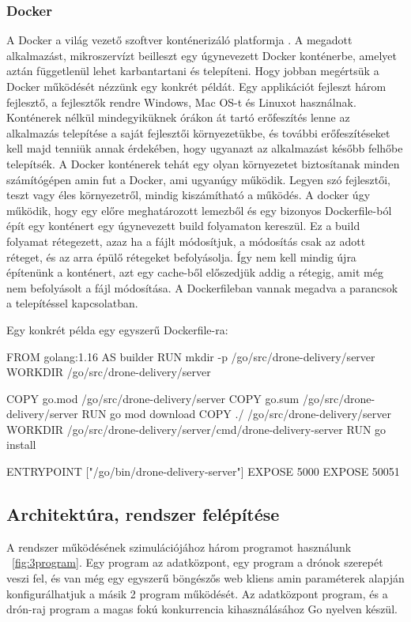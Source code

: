 \subsubsection{Docker}
A Docker a világ vezető szoftver konténerizáló platformja \cite{docker}.
A megadott alkalmazást, mikroszervízt beilleszt egy úgynevezett Docker konténerbe, amelyet aztán függetlenül lehet karbantartani és telepíteni.
Hogy jobban megértsük a Docker működését nézzünk egy konkrét példát.
Egy applikációt fejleszt három fejlesztő, a fejlesztők rendre Windows, Mac OS-t és Linuxot használnak.
Konténerek nélkül mindegyiküknek órákon át tartó erőfeszítés lenne az alkalmazás telepítése a saját fejlesztői környezetükbe, és további erőfeszítéseket kell majd tenniük annak érdekében, hogy ugyanazt az alkalmazást később felhőbe telepítsék.
A Docker konténerek tehát egy olyan környezetet biztosítanak minden számítógépen amin fut a Docker, ami ugyanúgy működik.
Legyen szó fejlesztői, teszt vagy éles környezetről, mindig kiszámítható a működés.
A docker úgy működik, hogy egy előre meghatározott lemezből és egy bizonyos Dockerfile-ból épít egy konténert egy úgynevezett build folyamaton kereszül.
Ez a build folyamat rétegezett, azaz ha a fájlt módosítjuk, a módosítás csak az adott réteget, és az arra épülő rétegeket befolyásolja.
Így nem kell mindig újra építenünk a konténert, azt egy cache-ből előszedjük addig a rétegig, amit még nem befolyásolt a fájl módosítása.
A Dockerfileban vannak megadva a parancsok a telepítéssel kapcsolatban.
\begin{example}
    Egy konkrét példa egy egyszerű Dockerfile-ra:
    \begin{docker}
        FROM golang:1.16 AS builder
        RUN mkdir -p /go/src/drone-delivery/server
        WORKDIR /go/src/drone-delivery/server

        COPY go.mod /go/src/drone-delivery/server
        COPY go.sum /go/src/drone-delivery/server
        RUN go mod download
        COPY ./ /go/src/drone-delivery/server
        WORKDIR /go/src/drone-delivery/server/cmd/drone-delivery-server
        RUN go install

        ENTRYPOINT ["/go/bin/drone-delivery-server"]
        EXPOSE 5000
        EXPOSE 50051
    \end{docker}
\end{example}


\subsection{Architektúra, rendszer felépítése}\label{subsec:architektúra-program-felépítés}
A rendszer működésének szimulációjához három programot használunk ~\ref{fig:3program}.
Egy program az adatközpont, egy program a drónok szerepét veszi fel, és van még egy egyszerű böngészős web kliens amin paraméterek alapján konfigurálhatjuk a másik 2 program működését.
Az adatközpont program, és a drón-raj program a magas fokú konkurrencia kihasználásához Go nyelven készül.


